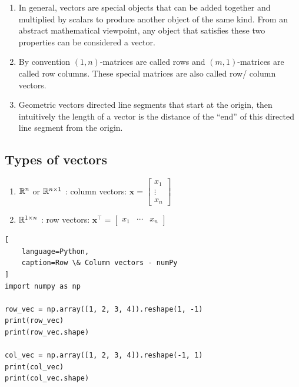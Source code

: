 \begin{enumerate}
    \item In general, vectors are special objects that can be added together and multiplied by scalars to produce another object of the same kind. From an abstract mathematical viewpoint, any object that satisfies these two properties can be considered a vector.
    \hfill \cite{mfml/book/mml/Deisenroth-Faisal-Ong}

    \item By convention $(1, n)$-matrices are called rows and $(m, 1)$-matrices are called row columns.
    These special matrices are also called row/ column vectors.
    \hfill \cite{mfml/book/mml/Deisenroth-Faisal-Ong}

    \item Geometric vectors directed line segments that start at the origin, then intuitively the length of a vector is the distance of the “end” of this directed line segment from the origin.
    \hfill \cite{mfml/book/mml/Deisenroth-Faisal-Ong}
\end{enumerate}




\subsection{Types of vectors}

\begin{enumerate}
    \item $\mathbb{R}^n$ or $\mathbb{R}^{n\times 1}$ : column vectors:
    $
        \bm{x} =
        \begin{bmatrix}
            x_1\\ \vdots \\ x_n
        \end{bmatrix}
    $
    \hfill \cite{mfml/book/mml/Deisenroth-Faisal-Ong}

    \item $\mathbb{R}^{1\times n}$ : row vectors:
    $
        \bm{x}^\top = \begin{bmatrix}x_1 & \cdots & x_n\end{bmatrix}
    $
    \hfill \cite{mfml/book/mml/Deisenroth-Faisal-Ong}
\end{enumerate}


\begin{lstlisting}[
    language=Python,
    caption=Row \& Column vectors - numPy
]
import numpy as np

row_vec = np.array([1, 2, 3, 4]).reshape(1, -1)
print(row_vec)
print(row_vec.shape)

col_vec = np.array([1, 2, 3, 4]).reshape(-1, 1)
print(col_vec)
print(col_vec.shape)
\end{lstlisting}

